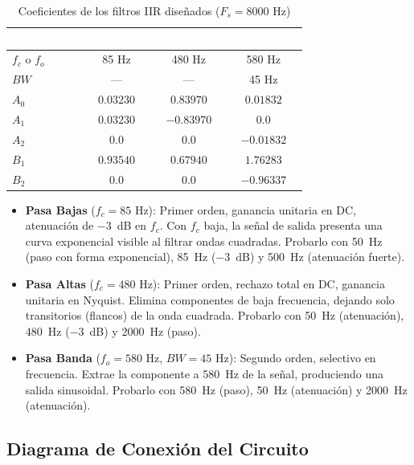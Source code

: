 \begin{table}[H]
    \centering
    \caption{Coeficientes de los filtros IIR diseñados ($F_s = 8000$ Hz)}
    \label{tab:coeficientes}
    \begin{tabular}{|l|c|c|c|}
        \hline
        \rowcolor{headblue}\textcolor{white}{\textbf{Coeficiente}} & \textcolor{white}{\textbf{Pasa Bajas}} & \textcolor{white}{\textbf{Pasa Altas}} & \textcolor{white}{\textbf{Pasa Banda}} \\
        \hline
        $f_c$ o $f_o$ & 85 Hz & 480 Hz & 580 Hz \\
        \hline
        $BW$ & --- & --- & 45 Hz \\
        \hline
        $A_0$ & $0.03230$ & $0.83970$ & $0.01832$ \\
        \hline
        $A_1$ & $0.03230$ & $-0.83970$ & $0.0$ \\
        \hline
        $A_2$ & $0.0$ & $0.0$ & $-0.01832$ \\
        \hline
        $B_1$ & $0.93540$ & $0.67940$ & $1.76283$ \\
        \hline
        $B_2$ & $0.0$ & $0.0$ & $-0.96337$ \\
        \hline
    \end{tabular}
\end{table}

\begin{itemize}
    \item \textbf{Pasa Bajas} ($f_c = 85$ Hz): Primer orden, ganancia unitaria en DC, atenuación de $-3$~dB en $f_c$. Con $f_c$ baja, la señal de salida presenta una curva exponencial visible al filtrar ondas cuadradas. Probarlo con 50~Hz (paso con forma exponencial), 85~Hz ($-3$~dB) y 500~Hz (atenuación fuerte).
    \item \textbf{Pasa Altas} ($f_c = 480$ Hz): Primer orden, rechazo total en DC, ganancia unitaria en Nyquist. Elimina componentes de baja frecuencia, dejando solo transitorios (flancos) de la onda cuadrada. Probarlo con 50~Hz (atenuación), 480~Hz ($-3$~dB) y 2000~Hz (paso).
    \item \textbf{Pasa Banda} ($f_o = 580$ Hz, $BW = 45$ Hz): Segundo orden, selectivo en frecuencia. Extrae la componente a 580~Hz de la señal, produciendo una salida sinusoidal. Probarlo con 580~Hz (paso), 50~Hz (atenuación) y 2000~Hz (atenuación).
\end{itemize}

\subsection{Diagrama de Conexión del Circuito}

